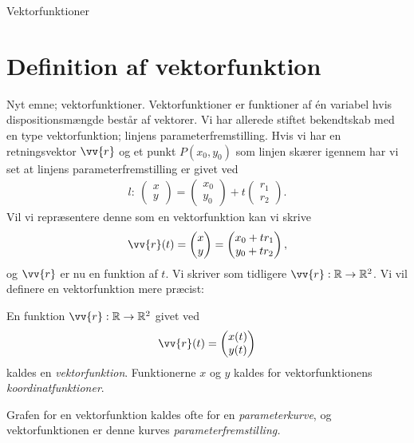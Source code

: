 
\begin{center}
	\Huge
	Vektorfunktioner
\end{center}
\section*{Definition af vektorfunktion}

Nyt emne; vektorfunktioner. Vektorfunktioner er funktioner af én variabel hvis dispositionsmængde består af vektorer. Vi har allerede stiftet bekendtskab med en type vektorfunktion; linjens parameterfremstilling. Hvis vi har en retningsvektor $\vv{r}$ og et punkt $P(x_0,y_0)$ som linjen skærer igennem har vi set at linjens parameterfremstilling er givet ved
\begin{align*}
	l:\ \begin{pmatrix} x \\ y
	\end{pmatrix} =
	\begin{pmatrix}
	x_0 \\ y_0
	\end{pmatrix} +t
	\begin{pmatrix}
	r_1 \\ r_2
	\end{pmatrix}.
\end{align*}
Vil vi repræsentere denne som en vektorfunktion kan vi skrive
\begin{align*}
	\vv{r}(t) = \begin{pmatrix} x \\ y
	\end{pmatrix} =
	\begin{pmatrix}
	x_0 + tr_1 \\
	y_0+tr_2
	\end{pmatrix},
\end{align*}
og $\vv{r}$ er nu en funktion af $t$. Vi skriver som tidligere $\vv{r}: \mathbb{R} \to \mathbb{R}^2$. Vi vil definere en vektorfunktion mere præcist:

\begin{defn}[Vektorfunktion]
	En funktion $\vv{r} : \mathbb{R} \to \mathbb{R}^2$ givet ved
	\begin{align*}
		\vv{r}(t) = 
		\begin{pmatrix}
			x(t) \\ y(t)
		\end{pmatrix}
	\end{align*}
	kaldes en \textit{vektorfunktion}.
	Funktionerne $x$ og $y$ kaldes for vektorfunktionens \textit{koordinatfunktioner}.
\end{defn}
Grafen for en vektorfunktion kaldes ofte for en \textit{parameterkurve}, og vektorfunktionen er denne kurves \textit{parameterfremstilling.} 

